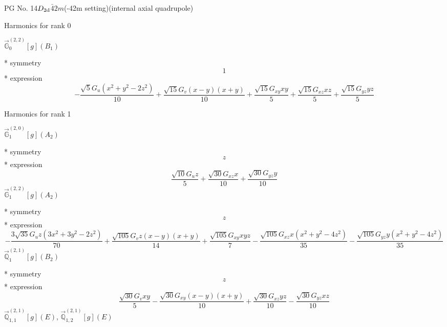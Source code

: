 \documentclass[fleqn,8pt]{jsarticle}
\begin{document}
\setcounter{MaxMatrixCols}{32}

\renewcommand{\tablename}{Table~}
\renewcommand{\figurename}{Figure~}
\begin{center}
\LARGE
PG No. 14\quad$D_{\rm 2d}$\quad$\bar{4}2m$\quad(-42m setting)\quad[ tetragonal ] (internal axial quadrupole)
\end{center}

\noindent * Harmonics for rank 0

\noindent\quad $\vec{\mathbb{G}}_{0}^{(2,2)}[g](B_{1})$

\noindent\quad ** symmetry
\begin{dmath*}
1
\end{dmath*}
\noindent\quad ** expression
\begin{dmath*}
- \frac{\sqrt{5} G_{u} \left(x^{2} + y^{2} - 2 z^{2}\right)}{10} + \frac{\sqrt{15} G_{v} \left(x - y\right) \left(x + y\right)}{10} + \frac{\sqrt{15} G_{xy} x y}{5} + \frac{\sqrt{15} G_{xz} x z}{5} + \frac{\sqrt{15} G_{yz} y z}{5}
\end{dmath*}

\noindent * Harmonics for rank 1

\noindent\quad $\vec{\mathbb{G}}_{1}^{(2,0)}[g](A_{2})$

\noindent\quad ** symmetry
\begin{dmath*}
z
\end{dmath*}
\noindent\quad ** expression
\begin{dmath*}
\frac{\sqrt{10} G_{u} z}{5} + \frac{\sqrt{30} G_{xz} x}{10} + \frac{\sqrt{30} G_{yz} y}{10}
\end{dmath*}
\noindent\quad $\vec{\mathbb{G}}_{1}^{(2,2)}[g](A_{2})$

\noindent\quad ** symmetry
\begin{dmath*}
z
\end{dmath*}
\noindent\quad ** expression
\begin{dmath*}
- \frac{3 \sqrt{35} G_{u} z \left(3 x^{2} + 3 y^{2} - 2 z^{2}\right)}{70} + \frac{\sqrt{105} G_{v} z \left(x - y\right) \left(x + y\right)}{14} + \frac{\sqrt{105} G_{xy} x y z}{7} - \frac{\sqrt{105} G_{xz} x \left(x^{2} + y^{2} - 4 z^{2}\right)}{35} - \frac{\sqrt{105} G_{yz} y \left(x^{2} + y^{2} - 4 z^{2}\right)}{35}
\end{dmath*}
\noindent\quad $\vec{\mathbb{Q}}_{1}^{(2,1)}[g](B_{2})$

\noindent\quad ** symmetry
\begin{dmath*}
z
\end{dmath*}
\noindent\quad ** expression
\begin{dmath*}
\frac{\sqrt{30} G_{v} x y}{5} - \frac{\sqrt{30} G_{xy} \left(x - y\right) \left(x + y\right)}{10} + \frac{\sqrt{30} G_{xz} y z}{10} - \frac{\sqrt{30} G_{yz} x z}{10}
\end{dmath*}
\noindent\quad $\vec{\mathbb{Q}}_{1,1}^{(2,1)}[g](E)$, $\vec{\mathbb{Q}}_{1,2}^{(2,1)}[g](E)$
\end{document}

